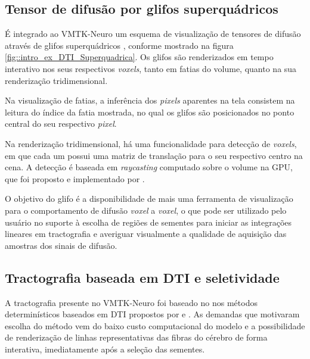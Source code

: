 \documentclass[
    12pt,                %
    oneside,            %
    a4paper,            %
    english,            %
    french,                %
    spanish,            %
    brazil                %
    ]{abntex2}
\begin{document}
\subsection{Tensor de difusão por glifos superquádricos}
\label{ssec::supequadricos}

É integrado ao VMTK-Neuro um esquema de visualização de tensores de difusão através de glifos superquádricos \cite{Kindlmann2004}, conforme mostrado na figura \ref{fig::intro_ex_DTI_Superquadrica}. Os glifos são renderizados em tempo interativo nos seus respectivos \textit{voxels}, tanto em fatias do volume, quanto na sua renderização tridimensional.

Na visualização de fatias, a inferência dos \textit{pixels} aparentes na tela consistem na leitura do índice da fatia mostrada, no qual os glifos são posicionados no ponto central do seu respectivo \textit{pixel}.

Na renderização tridimensional, há uma funcionalidade para detecção de \textit{voxels}, em que cada um possui uma matriz de translação para o seu respectivo centro na cena. A detecção é baseada em \textit{raycasting} computado sobre o volume na GPU, que foi proposto e implementado por .



O objetivo do glifo é a disponibilidade de mais uma ferramenta de visualização para o comportamento de difusão \textit{voxel} a \textit{voxel}, o que pode ser utilizado pelo usuário no suporte à escolha de regiões de sementes para iniciar as integrações lineares em tractografia e averiguar visualmente a qualidade de aquisição das amostras dos sinais de difusão.


\subsection{Tractografia baseada em DTI e seletividade}
\label{ssec::tractografia_e_seletividade}





A tractografia presente no VMTK-Neuro foi baseado no nos métodos determinísticos baseados em DTI propostos por  e . As demandas que motivaram escolha do método vem do baixo custo computacional do modelo e a possibilidade de renderização de linhas representativas das fibras do cérebro de forma interativa, imediatamente após a seleção das sementes.
\end{document}

